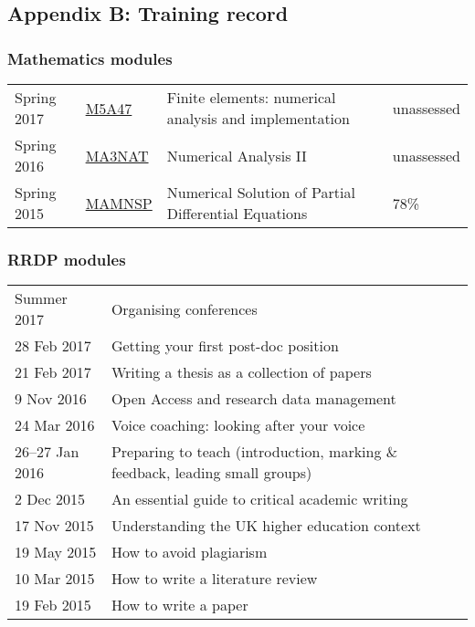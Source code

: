 \documentclass[a4paper,11pt]{article}
\begin{document}
\newpage

\subsection*{Appendix B: Training record}

\subsubsection*{Mathematics modules}
\footnotesize
\begin{tabular}{l l l l}
Spring 2017	& \href{https://finite-element.github.io}{M5A47}  & Finite elements: numerical analysis and implementation & unassessed \\
Spring 2016	& \href{www.reading.ac.uk/module/document.aspx?modP=MA3NAT&modYR=1516}{MA3NAT} & Numerical Analysis II & unassessed \\
Spring 2015	& \href{www.reading.ac.uk/modules/document.aspx?modP=MAMNSP&modYR=1415}{MAMNSP} & Numerical Solution of Partial Differential Equations  & 78\% \\
\end{tabular}

\subsubsection*{RRDP modules}
\begin{tabular}{l l}
Summer 2017	& Organising conferences \\
28 Feb 2017	& Getting your first post-doc position \\
21 Feb 2017	& Writing a thesis as a collection of papers \\
9 Nov 2016      & Open Access and research data management \\
24 Mar 2016	& Voice coaching: looking after your voice \\
26--27 Jan 2016 & Preparing to teach (introduction, marking \& feedback, leading small groups) \\
2 Dec 2015	& An essential guide to critical academic writing \\
17 Nov 2015	& Understanding the UK higher education context \\
19 May 2015	& How to avoid plagiarism \\
10 Mar 2015	& How to write a literature review \\
19 Feb 2015	& How to write a paper \\
\end{tabular}
\end{document}
